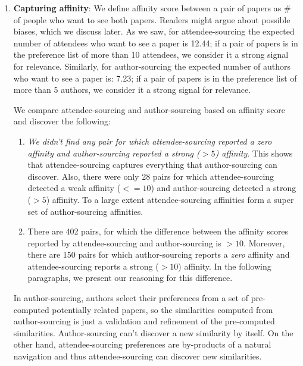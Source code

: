 \documentclass[letterpaper]{article}
\begin{document}
\begin{enumerate}
\item \textbf{Capturing affinity}: We define affinity score between a pair of papers as \# of people who want to see both papers. Readers might argue about possible biases, which we discuss later. As we saw, for attendee-sourcing the expected number of attendees who want to see a paper is 12.44; if a pair of papers is in the preference list of more than 10 attendees, we consider it a strong signal for relevance. Similarly, for author-sourcing the expected number of authors who want to see a paper is: 7.23; if a pair of papers is in the preference list of more than 5 authors, we consider it a strong signal for relevance.

We compare attendee-sourcing and author-sourcing based on affinity score and discover the following:
\begin{enumerate}
\item \emph{We didn't find any pair for which attendee-sourcing reported a zero affinity and author-sourcing reported a strong ($>5$) affinity}. This shows that attendee-sourcing captures everything that author-sourcing can discover. Also, there were only 28 pairs for which attendee-sourcing detected a weak affinity ($<=10$) and author-sourcing detected a strong ($>5$) affinity. To a large extent attendee-sourcing affinities form a super set of author-sourcing affinities.

\item There are 402 pairs, for which the difference between the affinity scores reported by attendee-sourcing and author-sourcing is $>10$. Moreover, there are 150 pairs for which author-sourcing reports a \emph{zero} affinity and attendee-sourcing reports a strong ($>10$) affinity. In the following paragraphs, we present our reasoning for this difference.

\end{enumerate}

In author-sourcing, authors select their preferences from a set of pre-computed potentially related papers, so the similarities computed from author-sourcing is just a validation and refinement of the pre-computed similarities. Author-sourcing can't discover a new similarity by itself. On the other hand, attendee-sourcing preferences are by-products of a natural navigation and thus attendee-sourcing can discover new similarities.


\end{enumerate}
\end{document}
